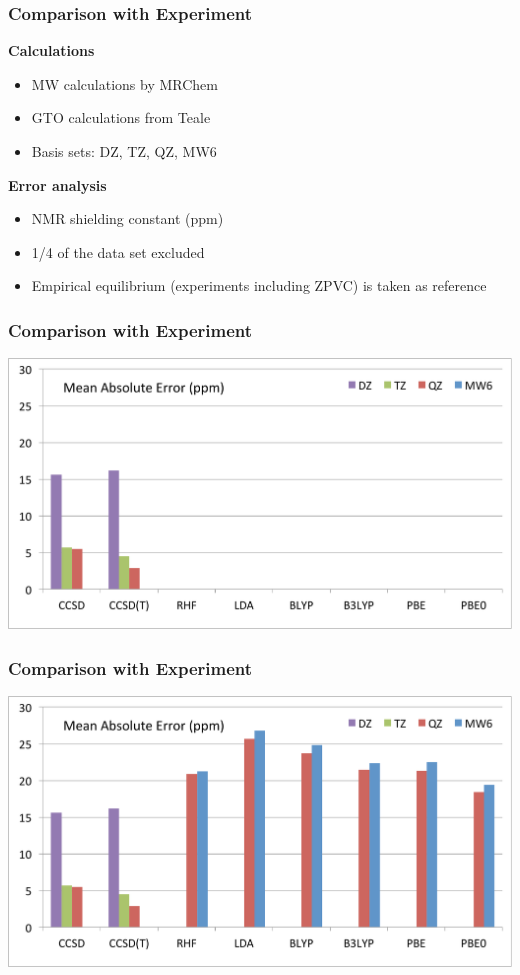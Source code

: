 \begin{frame}
\frametitle{Comparison with Experiment}
\textbf{Calculations}
\begin{itemize}
    \item   MW calculations by MRChem
    \item   GTO calculations from Teale \etal
    \item   Basis sets: DZ, TZ, QZ, MW6
\end{itemize}

\vspace{10mm}

\textbf{Error analysis}
\begin{itemize}
    \item   NMR shielding constant (ppm)
    \item   1/4 of the data set excluded
    \item   Empirical equilibrium (experiments including ZPVC) is taken as reference
\end{itemize}
\end{frame}


\begin{frame}
\frametitle{Comparison with Experiment}
\centering
\includegraphics[scale=0.3]{figures/mae_exp_1.pdf}
\end{frame}

\begin{frame}
\frametitle{Comparison with Experiment}
\centering
\includegraphics[scale=0.3]{figures/mae_exp_2.pdf}
\end{frame}

